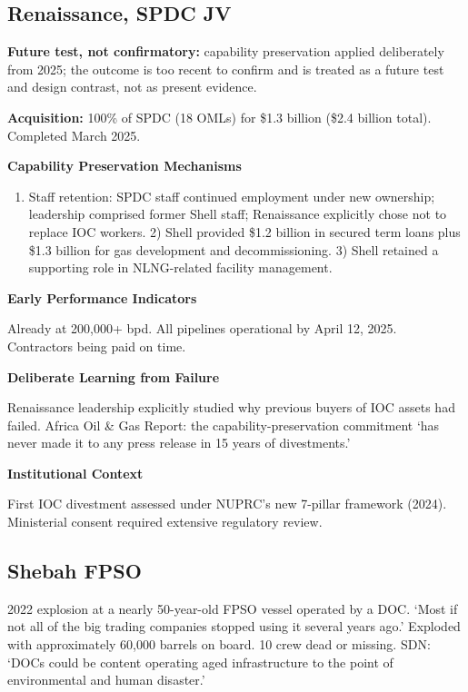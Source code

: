 \documentclass[twoside,fontset=lmodern]{mitthesis}
\providecommand{\tightlist}{\setlength{\itemsep}{0pt}\setlength{\parskip}{0pt}}
\begin{document}
\hypertarget{renaissance-spdc-jv}{%
\subsection{Renaissance, SPDC JV}\label{renaissance-spdc-jv}}

\textbf{Future test, not confirmatory:} capability preservation applied
deliberately from 2025; the outcome is too recent to confirm and is
treated as a future test and design contrast, not as present evidence.

\textbf{Acquisition:} 100\% of SPDC (18 OMLs) for \$1.3 billion (\$2.4
billion total). Completed March 2025.

\textbf{Capability Preservation Mechanisms}

\begin{enumerate}
\def\labelenumi{\arabic{enumi})}
\tightlist
\item
  Staff retention: SPDC staff continued employment under new ownership;
  leadership comprised former Shell staff; Renaissance explicitly chose
  not to replace IOC workers. 2) Shell provided \$1.2 billion in secured
  term loans plus \$1.3 billion for gas development and decommissioning.
  3) Shell retained a supporting role in NLNG-related facility
  management.
\end{enumerate}

\textbf{Early Performance Indicators}

Already at 200,000+ bpd. All pipelines operational by April 12, 2025.
Contractors being paid on time.

\textbf{Deliberate Learning from Failure}

Renaissance leadership explicitly studied why previous buyers of IOC
assets had failed. Africa Oil \& Gas Report: the capability-preservation
commitment `has never made it to any press release in 15 years of
divestments.'

\textbf{Institutional Context}

First IOC divestment assessed under NUPRC's new 7-pillar framework
(2024). Ministerial consent required extensive regulatory review.

\hypertarget{shebah-fpso}{%
\subsection{Shebah FPSO}\label{shebah-fpso}}

2022 explosion at a nearly 50-year-old FPSO vessel operated by a DOC.
`Most if not all of the big trading companies stopped using it several
years ago.' Exploded with approximately 60,000 barrels on board. 10 crew
dead or missing. SDN: `DOCs could be content operating aged
infrastructure to the point of environmental and human disaster.'
\end{document}
